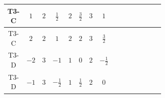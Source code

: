 \documentclass[8pt]{article}
\begin{document}
\begin{landscape}
\begin{longtable}{@{}cccccccc >{\raggedright\arraybackslash}p{0.21\linewidth} >{\raggedright\arraybackslash}p{0.21\linewidth} >{\raggedright\arraybackslash}p{0.21\linewidth}@{}}
T3-C & $1$ & $2$ & $\frac{1}{2}$ & $2$ & $\frac{3}{2}$ & $3$ & $1$ & \scriptsize\adjustbox{max width=\linewidth}{$\begin{gathered} +D_{\mu _1}\left(S_{2,j_1}\right){}^{\dagger } D_{\mu _1}\left(S_{2,j_1}\right)\end{gathered}$} & \scriptsize\adjustbox{max width=\linewidth}{$\begin{gathered} -\overline{F_{j_1,r_1}}\, F_{j_1,r_1} M_F\end{gathered}$} & \scriptsize\adjustbox{max width=\linewidth}{$\begin{gathered} +i \overline{F_{j_1,r_1}}\, \gamma ^{\mu _1}\, D_{\mu _1}\left(F_{j_1,r_1}\right)\end{gathered}$} \\
\midrule
T3-C & $2$ & $2$ & $1$ & $2$ & $2$ & $3$ & $\frac{3}{2}$ & \scriptsize\adjustbox{max width=\linewidth}{$\begin{gathered} +D_{\mu _1}\left(S_{2,j_1}\right){}^{\dagger } D_{\mu _1}\left(S_{2,j_1}\right)\end{gathered}$} & \scriptsize\adjustbox{max width=\linewidth}{$\begin{gathered} -\overline{F_{j_1,r_1}}\, F_{j_1,r_1} M_F\end{gathered}$} & \scriptsize\adjustbox{max width=\linewidth}{$\begin{gathered} +i \overline{F_{j_1,r_1}}\, \gamma ^{\mu _1}\, D_{\mu _1}\left(F_{j_1,r_1}\right)\end{gathered}$} \\
\midrule
T3-D & $-2$ & $3$ & $-1$ & $1$ & $0$ & $2$ & $-\frac{1}{2}$ & \scriptsize\adjustbox{max width=\linewidth}{$\begin{gathered} +D_{\mu _1}\left(S_2\right){}^{\dagger } D_{\mu _1}\left(S_2\right)\end{gathered}$} & \scriptsize\adjustbox{max width=\linewidth}{$\begin{gathered} -\overline{F_{j_1,r_1}}\, F_{j_1,r_1} M_F\end{gathered}$} & \scriptsize\adjustbox{max width=\linewidth}{$\begin{gathered} +i \overline{F_{j_1,r_1}}\, \gamma ^{\mu _1}\, D_{\mu _1}\left(F_{j_1,r_1}\right)\end{gathered}$} \\
\midrule
T3-D & $-1$ & $3$ & $-\frac{1}{2}$ & $1$ & $\frac{1}{2}$ & $2$ & $0$ & \scriptsize\adjustbox{max width=\linewidth}{$\begin{gathered} +D_{\mu _1}\left(S_2\right){}^{\dagger } D_{\mu _1}\left(S_2\right)\end{gathered}$} & \scriptsize\adjustbox{max width=\linewidth}{$\begin{gathered} -\overline{F_{j_1,r_1}}\, F_{j_1,r_1} M_F\end{gathered}$} & \scriptsize\adjustbox{max width=\linewidth}{$\begin{gathered} +i \overline{F_{j_1,r_1}}\, \gamma ^{\mu _1}\, D_{\mu _1}\left(F_{j_1,r_1}\right)\end{gathered}$} \\

\end{longtable}
\end{landscape}
\end{document}
